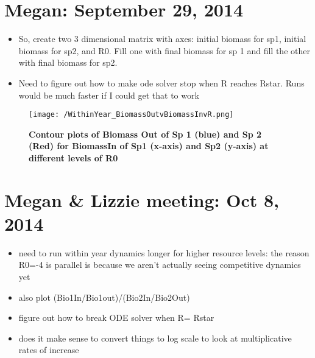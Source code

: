 \documentclass[11pt,a4paper,oneside]{article}
\begin{document}
\section{Megan: September 29, 2014}
\begin{itemize}
\item So, create two 3 dimensional matrix with axes: initial biomass for sp1, initial biomass for sp2, and R0.  Fill one with final biomass for sp 1 and fill the other with final biomass for sp2.
\item Need to figure out how to make ode solver stop when R reaches Rstar.  Runs would be much faster if I could get that to work
\end{itemize}
\begin{figure}[h!]
\centering
\noindent \texttt{[image: /WithinYear\_BiomassOutvBiomassInvR.png]}
\caption{{\bf Contour plots of Biomass Out of Sp 1 (blue) and Sp 2 (Red) for BiomassIn of Sp1 (x-axis) and Sp2 (y-axis) at different levels of R0}}
\end{figure}

\section{Megan & Lizzie meeting: Oct 8, 2014}
\begin{itemize}
\item need to run within year dynamics longer for higher resource levels:  the reason R0=-4 is parallel is because we aren't actually seeing competitive dynamics yet
\item  also plot (Bio1In/Bio1out)/(Bio2In/Bio2Out)
\item figure out how to break ODE solver when R= Rstar
\item does it make sense to convert things to log scale to look at multiplicative rates of increase
\end{itemize}
\end{document}
